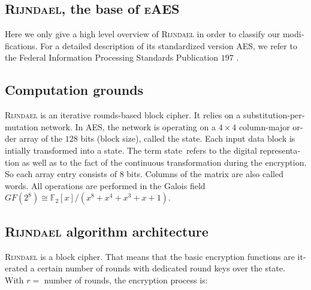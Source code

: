 \documentclass[a4paper,11pt]{article}
\begin{document}
\begin{otherlanguage}{english}
\section{\textsc{Rijndael}, the base of \textsc{eAES}}

\noindent
Here we only give a high level overview of \textsc{Rijndael} in order to classify our modifications. For a detailed description of its standardized version \textsc{AES}, we refer to the Federal Information Processing Standards Publication $197$ \cite{AES}. 

\subsection{Computation grounds}
\noindent
\textsc{Rijndael} is an iterative rounds-based block cipher. It relies on a substitution-permutation network. In \textsc{AES}, the network is operating on a $4 \times 4$ column-major order array of the $128$ bits (block size), called the \glqq state\grqq. Each input data block is intially transformed into a \glqq state\grqq. The term \glqq state\grqq \, refers to the digital representation as well as to the fact of the continuous transformation during the encryption. So each array entry consists of $8$ bits. Columns of the matrix are also called \glqq words\grqq. All operations are performed in the Galois field $GF (2^8) \cong \mathbb{F}_2 [x]/(x^8 + x^4 + x^3 + x + 1 )$.


\subsection{\textsc{Rijndael} algorithm architecture}
\noindent
\textsc{Rijndael} is a block cipher. That means that the basic encryption functions are iterated a certain number of rounds with dedicated round keys over the state. With $r = $ number of rounds, the encryption process is:\\


\end{otherlanguage}
\end{document}
